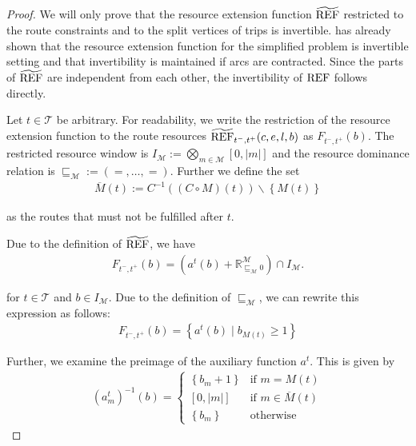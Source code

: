 \begin{proof}

We will only prove that the resource extension function $\widetilde{\operatorname{REF}}$ restricted to the route constraints and to the split vertices of trips is invertible. \cite{Kaiser} has already shown that the resource extension function for the simplified problem is invertible setting and that invertibility is maintained if arcs are contracted. Since the parts of $\widetilde{\operatorname{REF}}$ are independent from each other, the 	invertibility of $\operatorname{REF}$ follows directly.

Let ${t\in\mathcal{T}}$ be arbitrary. For readability, we write the restriction of the resource extension function to the route resources $\widetilde{\operatorname{REF}}_{t^-,t^+}(c,e,l,b)$ as $F_{t^-,t^+}(b)$. The restricted resource window is ${I_{\mathcal{M}}:=\bigotimes_{m\in\mathcal{M}}[0,\vert m\vert]}$ and the resource dominance relation is ${\sqsubseteq_{\mathcal{M}} := \left(=,\dots,=\right)}$. Further we define the set
\begin{align*}
	\overline{M}(t) := C^{-1}\left((C\circ M)(t)\right)\backslash\left\{M(t)\right\}
\end{align*}

as the routes that must not be fulfilled after $t$.

Due to the definition of $\widetilde{\operatorname{REF}}$, we have
\begin{align*}
	F_{t^-,t^+}\left(b\right) = \left(a^t(b) + \mathbb{R}^{\mathcal{M}}_{\sqsubseteq_{\mathcal{M}} 0}\right) \cap I_{\mathcal{M}}.
\end{align*}

for ${t\in\mathcal{T}}$ and ${b\in I_{\mathcal{M}}}$. Due to the definition of $\sqsubseteq_{\mathcal{M}}$, we can rewrite this expression as follows:
\begin{align*}
	F_{t^-,t^+}\left(b\right) = \left\{a^t(b)\mid b_{M(t)}\geq 1\right\}
\end{align*}

Further, we examine the preimage of the auxiliary function $a^t$. This is given by
\begin{align*}
	\left(a^t_m\right)^{-1}(b) = \begin{cases} \left\{b_m + 1\right\} & \text{if } m = M(t) \\ [0,\vert m\vert] & \text{if } m\in\overline{M}(t) \\ \left\{b_m\right\} & \text{otherwise} \end{cases}
\end{align*}


\end{proof}
